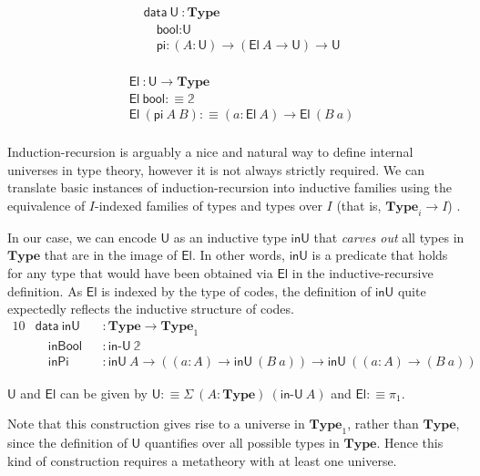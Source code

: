 \documentclass[a4paper,UKenglish,cleveref, autoref, thm-restate]{lipics-v2019}
\newcommand{\inU}{\mathsf{inU}}
\newcommand{\mType}{\mathbf{Type}}
\newcommand{\U}{\textsf{U}}
\newcommand{\El}{\textsf{El}}
\providecommand\mathbbm{\mathbb}
\begin{document}
\begin{minipage}{0.45\textwidth}
\begin{align*}
  & \textsf{data}\ \U\ : \mType \\
  & \quad \textsf{bool} : \U \\
  & \quad \textsf{pi} : (A : \U) \to (\El\ A \to \U) \to \U \\
\end{align*}
\end{minipage}
\begin{minipage}{0.45\textwidth}
\begin{align*}
  & \El\ : \U \to \mType \\
  & \El\ \textsf{bool} :\equiv \mathbbm{2} \\
  & \El\ (\textsf{pi}\ A\ B) :\equiv (a : \El\ A) \to \El\ (B\ a) \\
\end{align*}
\end{minipage}

Induction-recursion is arguably a nice and natural way to define internal
universes in type theory, however it is not always strictly required.
%
We can translate basic instances of induction-recursion into inductive families
using the equivalence of $I$-indexed families of types and types over $I$
(that is, $\mType_i \to I$) \cite{malatasta13smallir}.

In our case, we can encode $\U$ as an inductive type $\inU$ that
\emph{carves out} all types in $\mType$ that are in the image of $\El$. In other
words, $\inU$ is a predicate that holds for any type that would have been
obtained via $\El$ in the inductive-recursive definition. As $\El$ is indexed by
the type of codes, the definition of $\inU$ quite expectedly reflects the
inductive structure of codes.
%
\begin{alignat*}{10}
  & \textsf{data}\ \inU && : \mType \to \mType_1 \\
  & \quad \textsf{inBool} && : \textsf{in-U}\ \mathbbm{2} \\
  & \quad \textsf{inPi} && :  \inU\ A \to ((a : A) \to \inU\ (B\ a)) \to \inU\ ((a : A) \to (B\ a))
\end{alignat*}

$\U$ and $\El$ can be given by $\U :\equiv \Sigma\ (A : \mType)\ (\textsf{in-U}\ A)$ and $\El :\equiv \pi_1$.

Note that this construction gives rise to a universe in $\mType_1$, rather than
$\mType$, since the definition of $\U$ quantifies over all possible types in
$\mType$. Hence this kind of construction requires a metatheory with at least
one universe.
\end{document}
